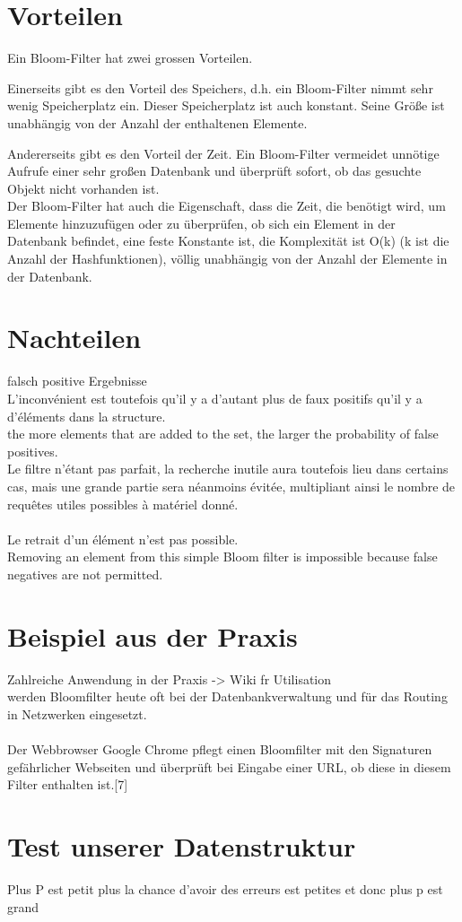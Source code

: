 \documentclass[12pt, letterpaper]{article}
\begin{document}
\section{Vorteilen}

Ein Bloom-Filter hat zwei grossen Vorteilen.

Einerseits gibt es den Vorteil des Speichers, d.h. ein Bloom-Filter nimmt sehr wenig Speicherplatz ein. Dieser Speicherplatz ist auch konstant. Seine Größe ist unabhängig von der Anzahl der enthaltenen Elemente.

Andererseits gibt es den Vorteil der Zeit. Ein Bloom-Filter vermeidet unnötige Aufrufe einer sehr großen Datenbank und überprüft sofort, ob das gesuchte Objekt nicht vorhanden ist.\\
Der Bloom-Filter hat auch die Eigenschaft, dass die Zeit, die benötigt wird, um Elemente hinzuzufügen oder zu überprüfen, ob sich ein Element in der Datenbank befindet, eine feste Konstante ist, die Komplexität ist O(k) (k ist die Anzahl der Hashfunktionen), völlig unabhängig von der Anzahl der Elemente in der Datenbank.

\section{Nachteilen}

falsch positive Ergebnisse\\
L'inconvénient est toutefois qu'il y a d'autant plus de faux positifs qu'il y a d'éléments dans la structure.\\
the more elements that are added to the set, the larger the probability of false positives.\\
Le filtre n'étant pas parfait, la recherche inutile aura toutefois lieu dans certains cas, mais une grande partie sera néanmoins évitée, multipliant ainsi le nombre de requêtes utiles possibles à matériel donné.\\
\\
Le retrait d'un élément n'est pas possible.\\
Removing an element from this simple Bloom filter is impossible because false negatives are not permitted.\\

\section{Beispiel aus der Praxis}

Zahlreiche Anwendung in der Praxis -> Wiki fr Utilisation\\
werden Bloomfilter heute oft bei der Datenbankverwaltung und für das Routing in Netzwerken eingesetzt.\\
\\
Der Webbrowser Google Chrome pflegt einen Bloomfilter mit den Signaturen gefährlicher Webseiten und überprüft bei Eingabe einer URL, ob diese in diesem Filter enthalten ist.[7]\\

\section{Test unserer Datenstruktur}
Plus P est petit plus la chance d'avoir des erreurs est petites et donc plus p est grand
\end{document}
